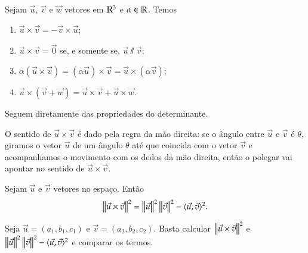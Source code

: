 \begin{proposicao}
  Sejam $\vec{u}$, $\vec{v}$ e $\vec{w}$ vetores em $\mathbb{R}^3$ e $\alpha \in \mathbb{R}$. Temos
  \begin{enumerate}[label=({\alph*})]
    \item $\vec{u}\times\vec{v} = -\vec{v}\times\vec{u}$;
    \item $\vec{u}\times\vec{v} = \vec{0}$ se, e somente se, $\vec{u}\varparallel\vec{v}$;
    \item $\alpha(\vec{u}\times\vec{v}) = (\alpha\vec{u})\times\vec{v} = \vec{u}\times(\alpha\vec{v})$;
    \item $\vec{u}\times(\vec{v} + \vec{w}) = \vec{u}\times\vec{v} + \vec{u}\times\vec{w}$.
  \end{enumerate}
\end{proposicao}
\begin{prova}
  Seguem diretamente das propriedades do determinante.
\end{prova}

\begin{observacao}
  O sentido de $\vec{u}\times\vec{v}$ \'e dado pela regra da m\~ao direita: se o \^angulo entre $\vec{u}$ e $\vec{v}$ \'e $\theta$, giramos o vetor $\vec{u}$ de um \^angulo $\theta$ at\'e que coincida com o vetor $\vec{v}$ e acompanhamos o movimento com os dedos da m\~ao direita, ent\~ao o polegar vai apontar no sentido de $\vec{u}\times\vec{v}$.
\end{observacao}

\begin{proposicao}\label{normaprodutovetorial}
  Sejam $\vec{u}$ e $\vec{v}$ vetores no espa\c{c}o. Ent\~ao
  \begin{equation}
    \left\Vert{\vec{u}\times\vec{v}}\right\Vert^2 = \left\Vert{\vec{u}}\right\Vert^2\left\Vert{\vec{v}}\right\Vert^2 - \langle \vec{u}, \vec{v} \rangle^2.
  \end{equation}
\end{proposicao}
\begin{prova}
  Seja $\vec{u} = (a_1,b_1,c_1)$ e $\vec{v} = (a_2,b_2,c_2)$. Basta calcular $\left\Vert{\vec{u}\times\vec{v}}\right\Vert^2$ e $\left\Vert{\vec{u}}\right\Vert^2\left\Vert{\vec{v}}\right\Vert^2 - \langle \vec{u}, \vec{v} \rangle^2$  e comparar os termos.
\end{prova}

